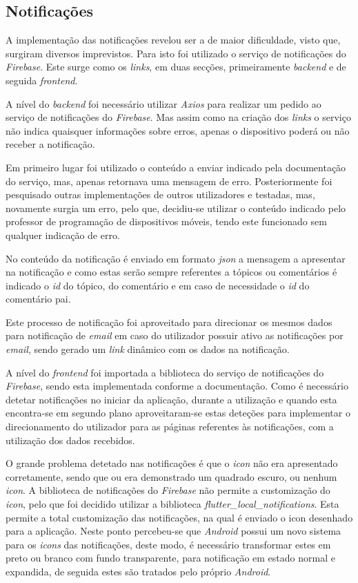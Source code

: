 \subsection{Notificações}

A implementação das notificações revelou ser a de maior dificuldade, visto que, surgiram diversos imprevistos. Para isto foi utilizado o serviço de notificações do \textit{Firebase}. Este surge como os \textit{links}, em duas secções, primeiramente \textit{backend} e de seguida \textit{frontend}.

A nível do \textit{backend} foi necessário utilizar \textit{Axios} para realizar um pedido ao serviço de notificações do \textit{Firebase}. Mas assim como na criação dos \textit{links} o serviço não indica quaisquer informações sobre erros, apenas o dispositivo poderá ou não receber a notificação. 

Em primeiro lugar foi utilizado o conteúdo a enviar indicado pela documentação do serviço, mas, apenas retornava uma mensagem de erro. Posteriormente foi pesquisado outras implementações de outros utilizadores e testadas, mas, novamente surgia um erro, pelo que, decidiu-se utilizar o conteúdo indicado pelo professor de programação de dispositivos móveis, tendo este funcionado sem qualquer indicação de erro. 

No conteúdo da notificação é enviado em formato \textit{\acrshort{json}} a mensagem a apresentar na notificação e como estas serão sempre referentes a tópicos ou comentários é indicado o \textit{id} do tópico, do comentário e em caso de necessidade o \textit{id} do comentário pai.

Este processo de notificação foi aproveitado para direcionar os mesmos dados para notificação de \textit{email} em caso do utilizador possuir ativo as notificações por \textit{email}, sendo gerado um \textit{link} dinâmico com os dados na notificação.

A nível do \textit{frontend} foi importada a biblioteca do serviço de notificações do \textit{Firebase}, sendo esta implementada conforme a documentação. Como é necessário detetar notificações no iniciar da aplicação, durante a utilização e quando esta encontra-se em segundo plano aproveitaram-se estas deteções para implementar o direcionamento do utilizador para as páginas referentes às notificações, com a utilização dos dados recebidos.

O grande problema detetado nas notificações é que o \textit{icon} não era apresentado corretamente, sendo que ou era demonstrado um quadrado escuro, ou nenhum \textit{icon}. A biblioteca de notificações do \textit{Firebase} não permite a customização do \textit{icon}, pelo que foi decidido utilizar a biblioteca \textit{flutter\_local\_notifications}. Esta permite a total customização das notificações, na qual é enviado o icon desenhado para a aplicação. Neste ponto percebeu-se que \textit{Android} possui um novo sistema para os \textit{icons} das notificações, deste modo, é necessário transformar estes em preto ou branco com fundo transparente, para notificação em estado normal e expandida, de seguida estes são tratados pelo próprio \textit{Android}.

